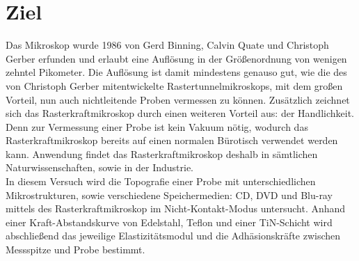 \section{Ziel}
\label{sec:Ziel}

Das Mikroskop wurde 1986 von Gerd Binning, Calvin Quate und Christoph Gerber
\cite{entw} erfunden und erlaubt eine Auflösung in der Größenordnung von wenigen
zehntel Pikometer. Die Auflösung ist damit mindestens genauso gut, wie die des
von Christoph Gerber mitentwickelte Rastertunnelmikroskops, mit dem großen Vorteil,
nun auch nichtleitende Proben vermessen zu können. Zusätzlich zeichnet sich das
Rasterkraftmikroskop durch einen weiteren Vorteil aus: der Handlichkeit. Denn zur
Vermessung einer Probe ist kein Vakuum nötig, wodurch das Rasterkraftmikroskop
bereits auf einen normalen Bürotisch verwendet werden kann. Anwendung findet das
Rasterkraftmikroskop deshalb in sämtlichen Naturwissenschaften, sowie in der
Industrie.\\
In diesem Versuch wird die Topografie einer Probe mit unterschiedlichen
Mikrostrukturen, sowie verschiedene Speichermedien: CD, DVD und Blu-ray mittels
des Rasterkraftmikroskop im Nicht-Kontakt-Modus untersucht. Anhand einer
Kraft-Abstandskurve von Edelstahl, Teflon und einer TiN-Schicht wird abschließend
das jeweilige Elastizitätsmodul und die Adhäsionskräfte zwischen Messspitze und
Probe bestimmt.

